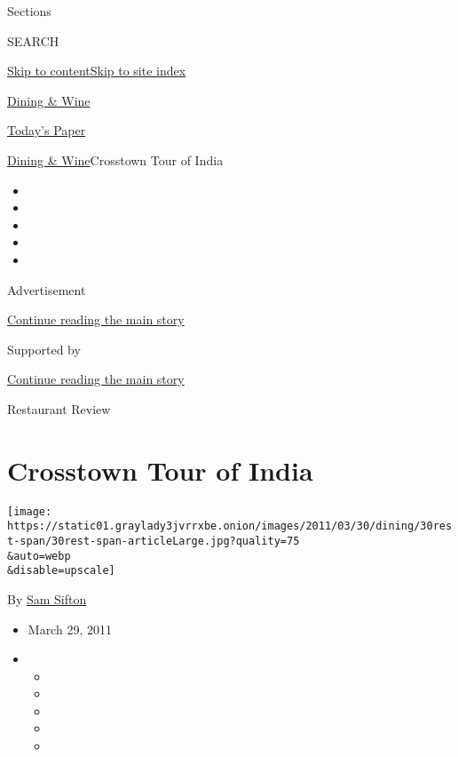 Sections

SEARCH

\protect\hyperlink{site-content}{Skip to
content}\protect\hyperlink{site-index}{Skip to site index}

\href{https://www.nytimes3xbfgragh.onion/pages/dining/index.html}{Dining
\& Wine}

\href{https://myaccount.nytimes3xbfgragh.onion/auth/login?response_type=cookie\&client_id=vi}{}

\href{https://www.nytimes3xbfgragh.onion/section/todayspaper}{Today's
Paper}

\href{/pages/dining/index.html}{Dining \& Wine}\textbar{}Crosstown Tour
of India

\begin{itemize}
\item
\item
\item
\item
\item
\end{itemize}

Advertisement

\protect\hyperlink{after-top}{Continue reading the main story}

Supported by

\protect\hyperlink{after-sponsor}{Continue reading the main story}

Restaurant Review

\hypertarget{crosstown-tour-of-india}{%
\section{Crosstown Tour of India}\label{crosstown-tour-of-india}}

\texttt{[image: https://static01.graylady3jvrrxbe.onion/images/2011/03/30/dining/30rest-span/30rest-span-articleLarge.jpg?quality=75\\\&auto=webp\\\&disable=upscale]}

By \href{https://www.nytimes3xbfgragh.onion/by/sam-sifton}{Sam Sifton}

\begin{itemize}
\item
  March 29, 2011
\item
  \begin{itemize}
  \item
  \item
  \item
  \item
  \item
  \end{itemize}
\end{itemize}

